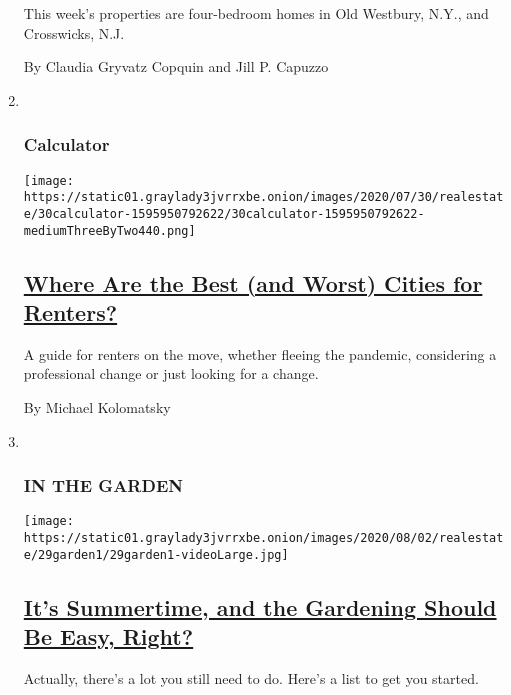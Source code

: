 \begin{enumerate}
  This week's properties are four-bedroom homes in Old Westbury, N.Y.,
  and Crosswicks, N.J.

  By Claudia Gryvatz Copquin and Jill P. Capuzzo
\item ~
  \hypertarget{calculator}{%
  \subsubsection{Calculator}\label{calculator}}

  \texttt{[image: https://static01.graylady3jvrrxbe.onion/images/2020/07/30/realestate/30calculator-1595950792622/30calculator-1595950792622-mediumThreeByTwo440.png]}

  \hypertarget{where-are-the-best-and-worst-cities-for-renters}{%
  \subsection{\texorpdfstring{\href{/2020/07/30/realestate/best-worst-cities-for-renters-coronavirus-relocation.html}{Where
  Are the Best (and Worst) Cities for
  Renters?}}{Where Are the Best (and Worst) Cities for Renters?}}\label{where-are-the-best-and-worst-cities-for-renters}}

  A guide for renters on the move, whether fleeing the pandemic,
  considering a professional change or just looking for a change.

  By Michael Kolomatsky
\item ~
  \hypertarget{in-the-garden}{%
  \subsubsection{IN THE GARDEN}\label{in-the-garden}}

  \texttt{[image: https://static01.graylady3jvrrxbe.onion/images/2020/08/02/realestate/29garden1/29garden1-videoLarge.jpg]}

  \hypertarget{its-summertime-and-the-gardening-should-be-easy-right}{%
  \subsection{\texorpdfstring{\href{/2020/07/29/realestate/garden-summer-august-chores.html}{It's
  Summertime, and the Gardening Should Be Easy,
  Right?}}{It's Summertime, and the Gardening Should Be Easy, Right?}}\label{its-summertime-and-the-gardening-should-be-easy-right}}

  Actually, there's a lot you still need to do. Here's a list to get you
  started.


\end{enumerate}
